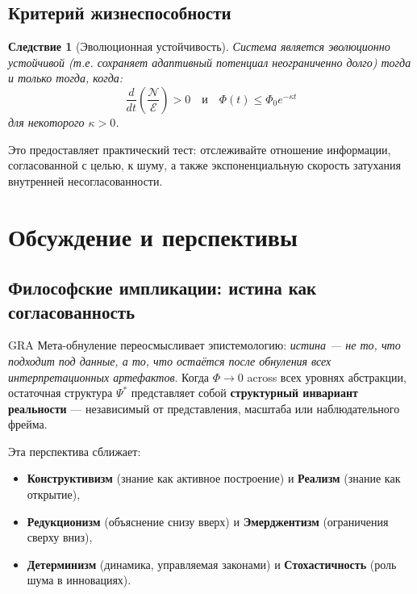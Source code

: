 \documentclass[11pt,a4paper]{article}
\theoremstyle{plain}
\newtheorem{corollary}[theorem]{Следствие}
\theoremstyle{definition}
\theoremstyle{remark}
\newcommand{\NegEntropy}{\mathcal{N}}
\newcommand{\Entropy}{\mathcal{E}}
\newcommand{\Foam}{\Phi}
\begin{document}
\subsection{Критерий жизнеспособности}

\begin{corollary}[Эволюционная устойчивость]
\label{cor:viability}
Система является эволюционно устойчивой (т.е. сохраняет адаптивный потенциал неограниченно долго) тогда и только тогда, когда:
\begin{equation}
\boxed{
\frac{d}{dt}\left(\frac{\NegEntropy}{\Entropy}\right) > 0 \quad \text{и} \quad \Foam(t) \leq \Foam_0 e^{-\kappa t}
}
\label{eq:viability}
\end{equation}
для некоторого $\kappa > 0$.
\end{corollary}

\noindent Это предоставляет практический тест: отслеживайте отношение информации, согласованной с целью, к шуму, а также экспоненциальную скорость затухания внутренней несогласованности.

\section{Обсуждение и перспективы}
\label{sec:discussion}

\subsection{Философские импликации: истина как согласованность}

GRA Мета-обнуление переосмысливает эпистемологию: \textit{истина --- не то, что подходит под данные, а то, что остаётся после обнуления всех интерпретационных артефактов}. Когда $\Foam \to 0$ across всех уровнях абстракции, остаточная структура $\Psi^*$ представляет собой \textbf{структурный инвариант реальности} --- независимый от представления, масштаба или наблюдательного фрейма.

Эта перспектива сближает:
\begin{itemize}
    \item \textbf{Конструктивизм} (знание как активное построение) и \textbf{Реализм} (знание как открытие),
    \item \textbf{Редукционизм} (объяснение снизу вверх) и \textbf{Эмерджентизм} (ограничения сверху вниз),
    \item \textbf{Детерминизм} (динамика, управляемая законами) и \textbf{Стохастичность} (роль шума в инновациях).
\end{itemize}
\end{document}
